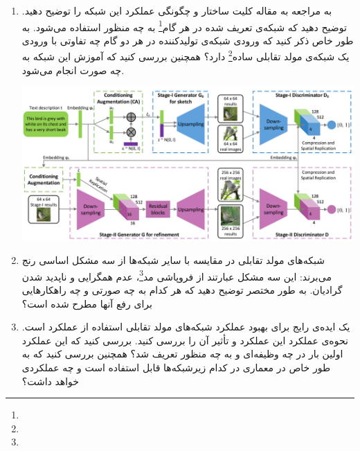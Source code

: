 \begin{enumerate}
	\item
	به مراجعه به مقاله \href{https://arxiv.org/abs/1612.03242}{\textcolor{magenta}{}} کلیت ساختار و چگونگی عملکرد این شبکه را توضیح دهید. توضیح دهید که شبکه‌ی تعریف شده در هر گام\footnote{} به چه منظور استفاده می‌شود. به طور خاص ذکر کنید که ورودی شبکه‌ی تولیدکننده در هر دو گام چه تفاوتی با ورودی یک شبکه‌ی مولد تقابلی ساده\footnote{} دارد؟ همچنین بررسی کنید که آموزش این شبکه به چه صورت انجام می‌شود.
	
	\begin{center}
		\includegraphics*[width=0.9\linewidth]{pics/img1.png}
		\label{معماری کلی شبکه مولد تقابلی پشته ای}
	\end{center}
	
	\begin{qsolve}
		 
	\end{qsolve}
	
	
	
	
	\item 
شبکه‌های مولد تقابلی در مقایسه با سایر شبکه‌ها از سه مشکل اساسی رنج می‌برند: این سه مشکل عبارتند از فروپاشی مد\footnote{}، عدم همگرایی و ناپدید شدن گرادیان. به طور مختصر توضیح دهید که هر کدام به چه صورتی و چه راهکارهایی برای رفع آنها مطرح شده است؟

	\begin{qsolve}
		
	\end{qsolve}




	
	
	
	
	
	\item 
یک ایده‌ی رایج برای بهبود عملکرد شبکه‌های مولد تقابلی استفاده از عملکرد  است. نحوه‌ی عملکرد این عملکرد و تأثیر آن را بررسی کنید. بررسی کنید که این عملکرد اولین بار در چه وظیفه‌ای و به چه منظور تعریف شد؟ همچنین بررسی کنید که به طور خاص در معماری  در کدام زیرشبکه‌ها قابل استفاده است و چه عملکردی خواهد داشت؟


\end{enumerate}
